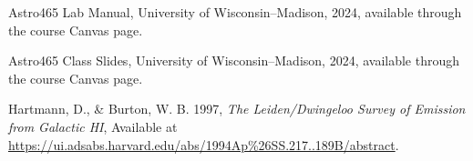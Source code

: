 \documentclass[linenumbers,twocolumn]{aastex631}
\begin{document}
\begin{thebibliography}{}

Astro465 Lab Manual, University of Wisconsin--Madison, 2024, available through the course Canvas page.

Astro465 Class Slides, University of Wisconsin--Madison, 2024, available through the course Canvas page.

\begin{flushright}
\begin{flushleft}
Hartmann, D., \& Burton, W. B. 1997, \textit{The Leiden/Dwingeloo Survey of Emission from Galactic HI}, Available at \url{https://ui.adsabs.harvard.edu/abs/1994Ap%26SS.217..189B/abstract}.
\end{flushleft}
\end{flushright}

\end{thebibliography}
\end{document}
